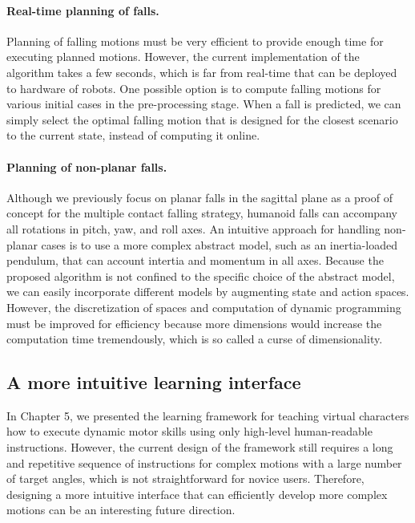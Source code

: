 \paragraph{Real-time planning of falls.}
Planning of falling motions must be very efficient to provide enough time for
executing planned motions. 
However, the current implementation of the algorithm takes a few seconds, which
is far from real-time that can be deployed to hardware of robots.
One possible option is to compute falling motions for
various initial cases in the pre-processing stage.
When a fall is predicted, we can simply select the optimal falling motion
that is designed for the closest scenario to the current state,
instead of computing it online.

\paragraph{Planning of non-planar falls.}
Although we previously focus on planar falls in the sagittal plane as a proof
of concept for the multiple contact falling strategy, humanoid falls
can accompany all rotations in pitch, yaw, and roll axes.
An intuitive approach for handling non-planar cases is to use a more complex
abstract model, such as an inertia-loaded pendulum, that can account intertia
and momentum in all axes.
Because the proposed algorithm is not confined to the specific choice of the
abstract model, we can easily incorporate different models by
augmenting state and action spaces. 
However, the discretization of spaces and computation of dynamic programming
must be improved for efficiency because more dimensions would increase the
computation time tremendously, which is so called a curse of dimensionality. 

\subsection{A more intuitive learning interface}

In Chapter 5, we presented the learning framework for teaching
virtual characters how to execute dynamic motor skills using only high-level
human-readable instructions. 
However, the current design of the framework still requires a long and
repetitive sequence of instructions for complex motions with a large 
number of target angles, which is not straightforward for novice users. 
Therefore, designing a more intuitive interface that can efficiently develop
more complex motions can be an interesting future direction.

